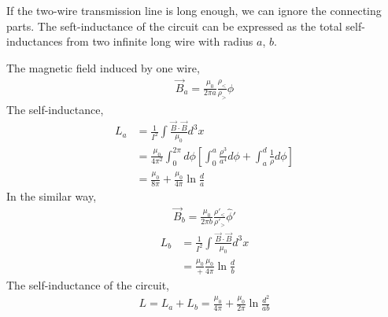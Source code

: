 \documentclass{article}
\begin{document}
If the two-wire transmission line is long enough, we can ignore the connecting parts. The seft-inductance of the circuit can be expressed as the total self-inductances from two infinite long wire with radius $a$, $b$.\par
The magnetic field induced by one wire,
\begin{align*}
  \vec B_a=\frac{\mu_0}{2\pi a}\frac{\rho_<}{\rho_>}\hat\phi
\end{align*}
The self-inductance,
\begin{align*}
  L_a&=\frac{1}{I^2}\int\frac{\vec B\cdot\vec B}{\mu_0}d^3x\\
     &=\frac{\mu_0}{4\pi^2}\int_0^{2\pi}d\phi[\int_0^a\frac{\rho^3}{a^4}d\phi+\int_a^d\frac{1}{\rho}d\phi]\\
     &=\frac{\mu_0}{8\pi}+\frac{\mu_0}{4\pi}\ln\frac{d}{a}
\end{align*}
In the similar way,
\begin{align*}
  \vec B_b=\frac{\mu_0}{2\pi b}\frac{\rho'_<}{\rho'_>}\hat\phi'
\end{align*}
\begin{align*}
  L_b&=\frac{1}{I^2}\int\frac{\vec B\cdot\vec B}{\mu_0}d^3x\\
  &=\frac{\mu_0}+\frac{\mu_0}{4\pi}\ln\frac{d}{b}
\end{align*}
The self-inductance of the circuit,
\begin{align*}
  L=L_a+L_b=\frac{\mu_0}{4\pi}+\frac{\mu_0}{2\pi}\ln\frac{d^2}{ab}
\end{align*}
\pagebreak
\end{document}
